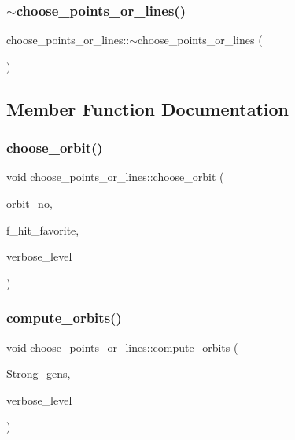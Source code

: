 \subsubsection{\texorpdfstring{$\sim$choose\+\_\+points\+\_\+or\+\_\+lines()}{~choose\_points\_or\_lines()}}
{\footnotesize\ttfamily choose\+\_\+points\+\_\+or\+\_\+lines\+::$\sim$choose\+\_\+points\+\_\+or\+\_\+lines (\begin{DoxyParamCaption}{ }\end{DoxyParamCaption})}



\subsection{Member Function Documentation}
\mbox{\label{classchoose__points__or__lines_a17def7dc2b9407b483d887fb24fab74d}} 
\subsubsection{\texorpdfstring{choose\+\_\+orbit()}{choose\_orbit()}}
{\footnotesize\ttfamily void choose\+\_\+points\+\_\+or\+\_\+lines\+::choose\+\_\+orbit (\begin{DoxyParamCaption}\item[{\mbox{\hyperlink{galois_8h_a09fddde158a3a20bd2dcadb609de11dc}{I\+NT}}}]{orbit\+\_\+no,  }\item[{\mbox{\hyperlink{galois_8h_a09fddde158a3a20bd2dcadb609de11dc}{I\+NT}} \&}]{f\+\_\+hit\+\_\+favorite,  }\item[{\mbox{\hyperlink{galois_8h_a09fddde158a3a20bd2dcadb609de11dc}{I\+NT}}}]{verbose\+\_\+level }\end{DoxyParamCaption})}

\mbox{\label{classchoose__points__or__lines_adc353e2d41dc8a39563322c8cdd85f61}} 
\subsubsection{\texorpdfstring{compute\+\_\+orbits()}{compute\_orbits()}}
{\footnotesize\ttfamily void choose\+\_\+points\+\_\+or\+\_\+lines\+::compute\+\_\+orbits (\begin{DoxyParamCaption}\item[{\mbox{\hyperlink{classstrong__generators}{strong\+\_\+generators}} $\ast$}]{Strong\+\_\+gens,  }\item[{\mbox{\hyperlink{galois_8h_a09fddde158a3a20bd2dcadb609de11dc}{I\+NT}}}]{verbose\+\_\+level }\end{DoxyParamCaption})}

